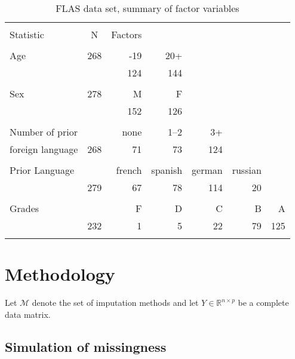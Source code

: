 \begin{table}[ht]
  \caption{FLAS data set, summary of factor variables}
  \label{tbl:flas:factor}
  \centering
\begin{tabular}{lrrrrrr}
\\[-1.8ex]\hline
\hline \\[-1.8ex]
Statistic & \multicolumn{1}{c}{N}  & Factors  &  &  &  &  \\
\hline \\[-1.8ex]
  Age  & 268 & -19 & 20+ & & \\
       & & 124 & 144  & & \\
\vspace{-5pt} \\

  Sex  & 278 & M & F & &  \\
       &     & 152 & 126 & &   \\
\vspace{-5pt} \\

  Number of prior & &  none & 1--2 & 3+ & & \\
  foreign language & 268  &  71 &  73 & 124 & &  \\
\vspace{-5pt} \\

  Prior Language & & french & spanish & german & russian & \\
       & 279 &  67 &  78 & 114 &  20 & \\
  \vspace{-5pt} \\

  Grades & & F & D & C  & B  & A \\
         & 232 & 1 & 5 & 22 & 79 & 125 \\
\hline \\[-1.8ex]
\end{tabular}
\end{table}

\section{Methodology}

Let $\mathcal{M}$ denote the set of imputation methods and let
$Y \in \mathbb{R}^{n\times p}$ be a complete data matrix.

\subsection{Simulation of missingness}

